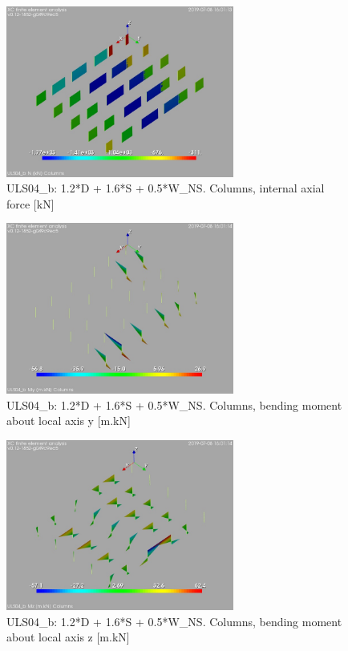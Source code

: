 \begin{figure}
\begin{center}
\includegraphics[width=75mm]{annex_res_columns/graphics/resSimplLC/ULS04_bcolumnsN}
\caption{ULS04\_b: 1.2*D + 1.6*S + 0.5*W\_NS. Columns, internal axial force [kN]}
\end{center}
\end{figure}
\begin{figure}
\begin{center}
\includegraphics[width=75mm]{annex_res_columns/graphics/resSimplLC/ULS04_bcolumnsMy}
\caption{ULS04\_b: 1.2*D + 1.6*S + 0.5*W\_NS. Columns, bending moment about local axis y [m.kN]}
\end{center}
\end{figure}
\begin{figure}
\begin{center}
\includegraphics[width=75mm]{annex_res_columns/graphics/resSimplLC/ULS04_bcolumnsMz}
\caption{ULS04\_b: 1.2*D + 1.6*S + 0.5*W\_NS. Columns, bending moment about local axis z [m.kN]}
\end{center}
\end{figure}
